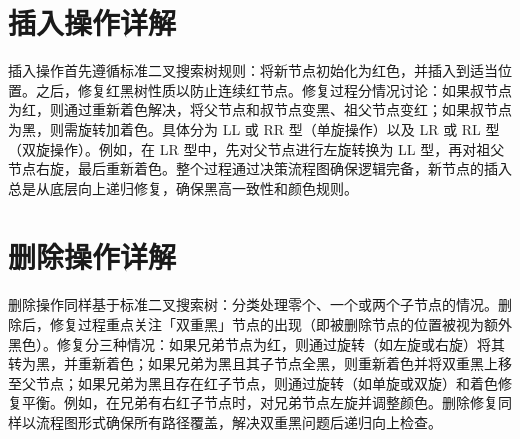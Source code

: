 \chapter{插入操作详解}
插入操作首先遵循标准二叉搜索树规则：将新节点初始化为红色，并插入到适当位置。之后，修复红黑树性质以防止连续红节点。修复过程分情况讨论：如果叔节点为红，则通过重新着色解决，将父节点和叔节点变黑、祖父节点变红；如果叔节点为黑，则需旋转加着色。具体分为 LL 或 RR 型（单旋操作）以及 LR 或 RL 型（双旋操作）。例如，在 LR 型中，先对父节点进行左旋转换为 LL 型，再对祖父节点右旋，最后重新着色。整个过程通过决策流程图确保逻辑完备，新节点的插入总是从底层向上递归修复，确保黑高一致性和颜色规则。\par
\chapter{删除操作详解}
删除操作同样基于标准二叉搜索树：分类处理零个、一个或两个子节点的情况。删除后，修复过程重点关注「双重黑」节点的出现（即被删除节点的位置被视为额外黑色）。修复分三种情况：如果兄弟节点为红，则通过旋转（如左旋或右旋）将其转为黑，并重新着色；如果兄弟为黑且其子节点全黑，则重新着色并将双重黑上移至父节点；如果兄弟为黑且存在红子节点，则通过旋转（如单旋或双旋）和着色修复平衡。例如，在兄弟有右红子节点时，对兄弟节点左旋并调整颜色。删除修复同样以流程图形式确保所有路径覆盖，解决双重黑问题后递归向上检查。\par
